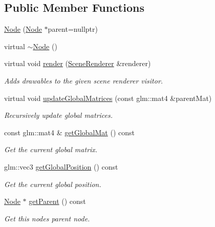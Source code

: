 \subsection*{Public Member Functions}
\begin{DoxyCompactItemize}
\item 
\mbox{\hyperlink{classec_1_1_node_a38582758606734f5f3a0e5c6d3dc0200}{Node}} (\mbox{\hyperlink{classec_1_1_node}{Node}} $\ast$parent=nullptr)
\item 
virtual \mbox{\hyperlink{classec_1_1_node_a6b2dfa6d2490ec46a5d15a326780889b}{$\sim$\+Node}} ()
\item 
virtual void \mbox{\hyperlink{classec_1_1_node_add44dc77d499886e9c75a0e1c1e446cf}{render}} (\mbox{\hyperlink{classec_1_1_scene_renderer}{Scene\+Renderer}} \&renderer)
\begin{DoxyCompactList}\small\item\em Adds drawables to the given scene renderer visitor. \end{DoxyCompactList}\item 
virtual void \mbox{\hyperlink{classec_1_1_node_a12a9b14ccc434c52404e262ef5db6f80}{update\+Global\+Matrices}} (const glm\+::mat4 \&parent\+Mat)
\begin{DoxyCompactList}\small\item\em Recursively update global matrices. \end{DoxyCompactList}\item 
const glm\+::mat4 \& \mbox{\hyperlink{classec_1_1_node_aecf550ed169a643bd9c23979377d8afc}{get\+Global\+Mat}} () const
\begin{DoxyCompactList}\small\item\em Get the current global matrix. \end{DoxyCompactList}\item 
glm\+::vec3 \mbox{\hyperlink{classec_1_1_node_ab4072f05f2b51e3d76f67e8557fc2134}{get\+Global\+Position}} () const
\begin{DoxyCompactList}\small\item\em Get the current global position. \end{DoxyCompactList}\item 
\mbox{\hyperlink{classec_1_1_node}{Node}} $\ast$ \mbox{\hyperlink{classec_1_1_node_ae1f93035b3df9db7a24afc06a7526dab}{get\+Parent}} () const
\begin{DoxyCompactList}\small\item\em Get this node\textquotesingle{}s parent node. \end{DoxyCompactList}\item 

\end{DoxyCompactItemize}
